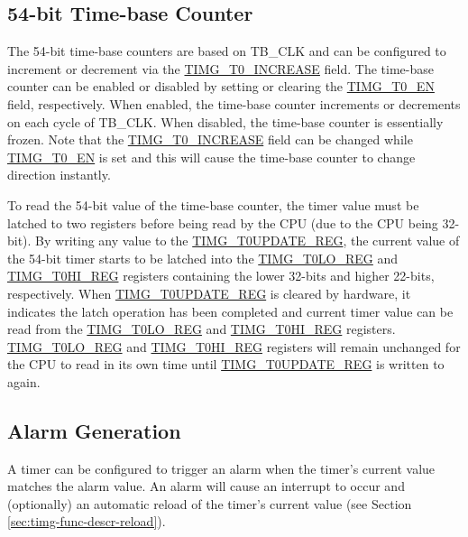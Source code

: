 \documentclass[main\_\_EN.tex]{subfiles}
\begin{document}
\subsection{54-bit Time-base Counter}
The 54-bit time-base counters are based on TB\_CLK and can be configured to increment or decrement via the \hyperref[fielddesc:TIMGTXINCREASE]{TIMG\_T0\_INCREASE} field. The time-base counter can be enabled or disabled by setting or clearing the \hyperref[fielddesc:TIMGTXEN]{TIMG\_T0\_EN} field, respectively. When enabled, the time-base counter increments or decrements on each cycle of TB\_CLK. When disabled, the time-base counter is essentially frozen. Note that the \hyperref[fielddesc:TIMGTXINCREASE]{TIMG\_T0\_INCREASE} field can be changed while \hyperref[fielddesc:TIMGTXEN]{TIMG\_T0\_EN} is set and this will cause the time-base counter to change direction instantly.

To read the 54-bit value of the time-base counter, the timer value must be latched to two registers before being read by the CPU (due to the CPU being 32-bit). By writing any value to the \hyperref[regdesc:TIMGTXUPDATEREG]{TIMG\_T0UPDATE\_REG}, the current value of the 54-bit timer starts to be latched into the \hyperref[regdesc:TIMGTXLOREG]{TIMG\_T0LO\_REG} and \hyperref[regdesc:TIMGTXHIREG]{TIMG\_T0HI\_REG} registers containing the lower 32-bits and 
higher 22-bits, respectively. When \hyperref[regdesc:TIMGTXUPDATEREG]{TIMG\_T0UPDATE\_REG} is cleared by hardware, it indicates the latch operation has been completed and current timer value can be read from the \hyperref[regdesc:TIMGTXLOREG]{TIMG\_T0LO\_REG} and \hyperref[regdesc:TIMGTXHIREG]{TIMG\_T0HI\_REG} registers. \hyperref[regdesc:TIMGTXLOREG]{TIMG\_T0LO\_REG} and \hyperref[regdesc:TIMGTXHIREG]{TIMG\_T0HI\_REG} registers will remain unchanged for the CPU to read in its own time until \hyperref[regdesc:TIMGTXUPDATEREG]{TIMG\_T0UPDATE\_REG} is written to again.

\subsection{Alarm Generation}
A timer can be configured to trigger an alarm when the timer's current value matches the alarm value. An alarm will cause an interrupt to occur and (optionally) an automatic reload of the timer's current value (see Section \ref{sec:timg-func-descr-reload}). 
\end{document}
